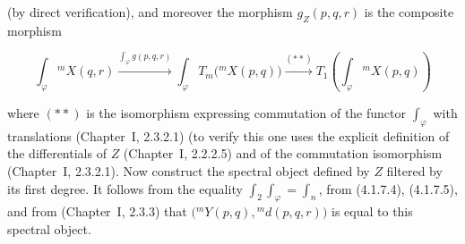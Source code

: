 (by direct verification), and moreover the morphism $g_Z(p,q,r)$ is the
composite morphism

\begin{equation}
\int_\varphi{}^{m}\!X(q,r)
\xrightarrow{\int_\varphi g(p,q,r)}
\int_\varphi T_m\bigl({}^{m}\!X(p,q)\bigr)
\xrightarrow{(**)}
T_1\left(\int_\varphi{}^{m}\!X(p,q)\right)
\tag{4.1.7.5}
\end{equation}

where $(**)$ is the isomorphism expressing commutation of the functor
$\int_\varphi$ with translations (Chapter~I, 2.3.2.1) (to verify this one
uses the explicit definition of the differentials of $Z$ (Chapter~I,
2.2.2.5) and of the commutation isomorphism (Chapter~I, 2.3.2.1). Now
construct the spectral object defined by $Z$ filtered by its first degree.
It follows from the equality $\int_2\int_\varphi=\int_n$, from (4.1.7.4),
(4.1.7.5), and from (Chapter~I, 2.3.3) that
$\bigl({}^{m}\!Y(p,q),{}^{m}\!d(p,q,r)\bigr)$ is equal to this spectral
object.
\endgroup
